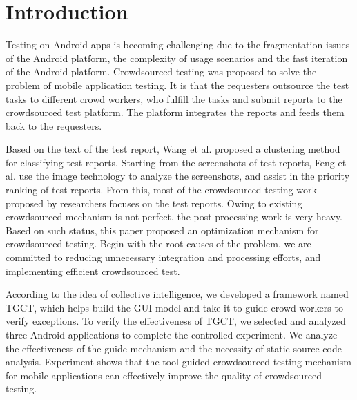 \section{Introduction}
Testing on Android apps is becoming challenging due to the fragmentation issues of the Android platform\cite{b1}, the complexity of usage scenarios and the fast iteration of the Android platform.
Crowdsourced testing was proposed to solve the problem of mobile application testing. It is that the requesters outsource the test tasks to different crowd workers, who fulfill the tasks and submit reports to the crowdsourced test platform. The platform integrates the reports and feeds them back to the requesters\cite{b2}. 

Based on the text of the test report, Wang et al.\cite{b3} proposed a clustering method for classifying test reports.
Starting from the screenshots of test reports, Feng et al.\cite{b9} use the image technology to analyze the screenshots, and assist in the priority ranking of test reports. From this, most of the crowdsourced testing work proposed by researchers focuses on the test reports. 
Owing to existing crowdsourced mechanism is not perfect, the post-processing work is very heavy. Based on such status, this paper proposed an optimization mechanism for crowdsourced testing. Begin with the root causes of the problem, we are committed to reducing unnecessary integration and processing efforts, and implementing efficient crowdsourced test.


According to the idea of collective intelligence\cite{b4}, we developed a framework named TGCT, which helps build the GUI model and take it to guide crowd workers to verify exceptions. To verify the effectiveness of TGCT, we selected and analyzed three Android applications to complete the controlled experiment. We analyze the effectiveness of the guide mechanism and the necessity of static source code analysis. Experiment shows that the tool-guided crowdsourced testing mechanism for mobile applications can effectively improve the quality of crowdsourced testing.

